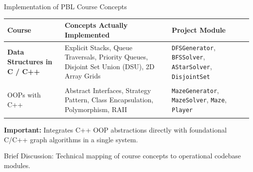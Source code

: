 \documentclass[aspectratio=169,11pt]{beamer}
\newcommand{\smallnote}[1]{%
\vspace{0.08cm}
{\scriptsize\color{GEUGrey}#1}
}
\begin{document}
\begin{frame}{Implementation of PBL Course Concepts}

\scriptsize

\begin{center}

\renewcommand{\arraystretch}{1.25}

\begin{tabularx}{.96\textwidth}
{@{}>{\bfseries\RaggedRight}p{3.2cm}Y R{3.4cm}@{}}

\toprule
Course & Concepts Actually Implemented & Project Module\\
\midrule

Data Structures in C / C++ &
Explicit Stacks, Queue Traversals, Priority Queues, Disjoint Set Union (DSU), 2D Array Grids &
\texttt{DFSGenerator}, \texttt{BFSSolver}, \texttt{AStarSolver}, \texttt{DisjointSet}\\

\midrule

OOPs with C++ &
Abstract Interfaces, Strategy Pattern, Class Encapsulation, Polymorphism, RAII &
\texttt{MazeGenerator}, \texttt{MazeSolver}, \texttt{Maze}, \texttt{Player}\\

\bottomrule

\end{tabularx}

\end{center}

\vfill

\begin{center}
\colorbox{GEULightBlue}{
\parbox{.88\textwidth}{
\centering
\textbf{Important:}
Integrates C++ OOP abstractions directly with foundational C/C++ graph algorithms in a single system.
}}
\end{center}

\smallnote{
Brief Discussion: Technical mapping of course concepts to operational codebase modules.
}

\end{frame}
\end{document}
